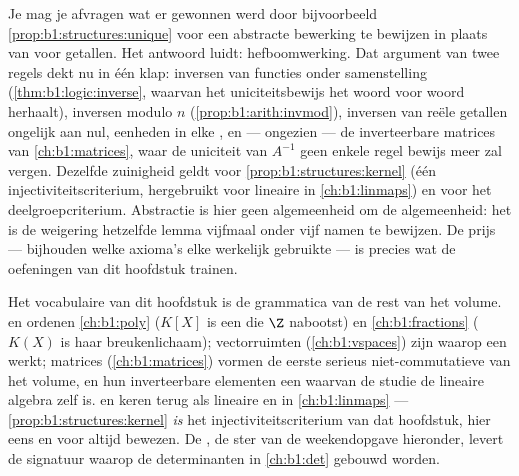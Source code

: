 \begin{remark}\label{rem:b1:structures:interlude}
Je mag je afvragen wat er gewonnen werd door bijvoorbeeld
\cref{prop:b1:structures:unique} voor een abstracte bewerking te bewijzen
in plaats van voor getallen. Het antwoord luidt: hefboomwerking. Dat
argument van twee regels dekt nu in één klap: inversen van functies onder
samenstelling (\cref{thm:b1:logic:inverse}, waarvan het uniciteitsbewijs
het woord voor woord herhaalt), inversen modulo $n$
(\cref{prop:b1:arith:invmod}), inversen van reële getallen ongelijk aan
nul, eenheden in elke , en --- ongezien --- de inverteerbare matrices
van \cref{ch:b1:matrices}, waar de uniciteit van $A^{-1}$ geen enkele regel
bewijs meer zal vergen. Dezelfde zuinigheid geldt voor
\cref{prop:b1:structures:kernel} (één injectiviteitscriterium, hergebruikt
voor lineaire  in \cref{ch:b1:linmaps}) en voor het
deelgroepcriterium. Abstractie is hier geen algemeenheid om de
algemeenheid: het is de weigering hetzelfde lemma vijfmaal onder vijf
namen te bewijzen. De prijs --- bijhouden welke axioma's elke 
werkelijk gebruikte --- is precies wat de oefeningen van dit hoofdstuk
trainen.
\end{remark}

\begin{remark}\label{rem:b1:structures:whereused}
Het vocabulaire van dit hoofdstuk is de grammatica van de rest van het
volume.  en  ordenen \cref{ch:b1:poly} ($K[X]$ is een 
die $\Z$ nabootst) en \cref{ch:b1:fractions} ($K(X)$ is haar
breukenlichaam); vectorruimten (\cref{ch:b1:vspaces}) zijn 
waarop een  werkt; matrices (\cref{ch:b1:matrices}) vormen de eerste
serieus niet-commutatieve  van het volume, en hun inverteerbare
elementen een  waarvan de studie de lineaire algebra zelf is.
 en  keren terug als lineaire  en  in
\cref{ch:b1:linmaps} --- \cref{prop:b1:structures:kernel} \emph{is} het
injectiviteitscriterium van dat hoofdstuk, hier eens en voor altijd
bewezen. De , de ster van de weekendopgave hieronder,
levert de signatuur waarop de determinanten in \cref{ch:b1:det} gebouwd
worden.
\end{remark}

